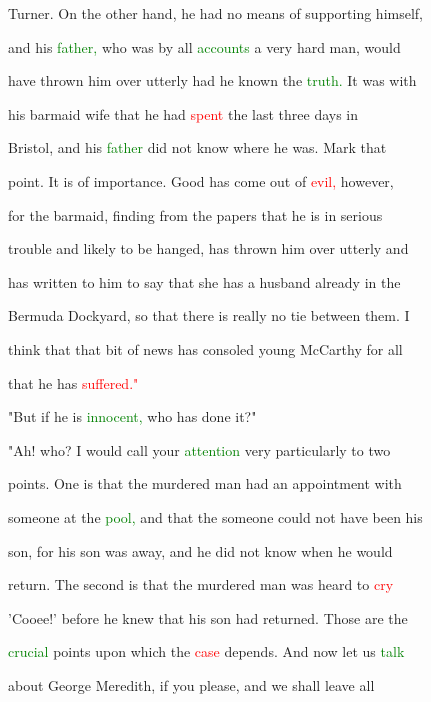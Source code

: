  Turner. On the other hand, he had no means of supporting himself,

 and his \textcolor{green}{father,} who was by all \textcolor{green}{accounts} a very hard man, would

 have thrown him over utterly had he known the \textcolor{green}{truth.} It was with

 his barmaid wife that he had \textcolor{red}{spent} the last three days in

 Bristol, and his \textcolor{green}{father} did not know where he was. Mark that

 point. It is of \textcolor{BurntOrange}{importance.} \textcolor{BurntOrange}{Good} has come out of \textcolor{red}{evil,} however,

 for the barmaid, finding from the papers that he is in serious

 trouble and likely to be hanged, has thrown him over utterly and

 has written to him to say that she has a husband already in the

 Bermuda Dockyard, so that there is really no tie between them. I

 think that that bit of news has \textcolor{BurntOrange}{consoled} \textcolor{BurntOrange}{young} McCarthy for all

 that he has \textcolor{red}{suffered."}



 "But if he is \textcolor{green}{innocent,} who has done it?"



 "Ah! who? I would call your \textcolor{green}{attention} very particularly to two

 points. One is that the \textcolor{BurntOrange}{murdered} man had an appointment with

 someone at the \textcolor{green}{pool,} and that the someone could not have been his

 son, for his son was away, and he did not know when he would

 return. The second is that the \textcolor{BurntOrange}{murdered} man was heard to \textcolor{red}{cry}

 'Cooee!' before he knew that his son had returned. Those are the

 \textcolor{green}{crucial} points upon which the \textcolor{red}{case} depends. And now let us \textcolor{green}{talk}

 about George Meredith, if you please, and we shall \textcolor{BurntOrange}{leave} all

